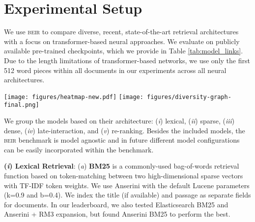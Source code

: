 \documentclass{article}
\newcommand{\custo}[1]{\textsc{\normalsize #1}}
\newcommand{\beir}{\custo{beir}\xspace}
\begin{document}
\vspace{-2mm}
\section{Experimental Setup}
\vspace{-2mm}


We use \beir to compare diverse, recent, state-of-the-art retrieval architectures with a focus on transformer-based neural approaches. We evaluate on publicly available pre-trained checkpoints, which we provide in Table \ref{tab:model_links}. Due to the length limitations of transformer-based networks, we use only the first 512 word pieces within all documents in our experiments across all neural architectures. 


\begin{figure*}[t]
\centering
\begin{center}
    \texttt{[image: figures/heatmap-new.pdf]}
    \texttt{[image: figures/diversity-graph-final.png]}
    \caption{Domain overlap across each pairwise dataset in the \beir benchmark. Heatmap (left) shows the pairwise weighted jaccard similarity scores between \beir datasets. 2D representation (right) using a force-directed placement algorithm with NetworkX \cite{SciPyProceedings_11}. We color and mark datasets differently for different domains. \vspace{-5mm}}
    \label{fig:diversity-graph}
\end{center}
\vspace*{-\baselineskip}
\end{figure*}


We group the models based on their architecture: (\emph{i}) lexical, (\emph{ii}) sparse, (\emph{iii}) dense, (\emph{iv}) late-interaction, and (\emph{v}) re-ranking. Besides the included models, the \beir benchmark is model agnostic and in future different model configurations can be easily incorporated within the benchmark.

\textbf{(\emph{i}) Lexical Retrieval}: (\emph{a}) \textbf{BM25} \cite{bm25} is a commonly-used bag-of-words retrieval function based on token-matching between two high-dimensional sparse vectors with TF-IDF token weights. We use Anserini \cite{lin2016toward} with the default Lucene parameters (k=0.9 and b=0.4). We index the title (if available) and passage as separate fields for documents. In our leaderboard, we also tested Elasticsearch BM25 and Anserini + RM3 expansion, but found Anserini BM25 to perform the best. 
\end{document}
